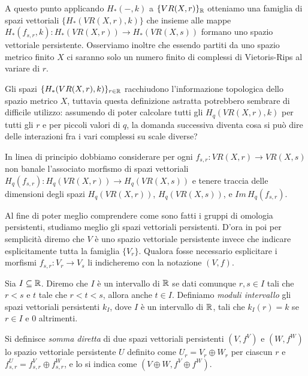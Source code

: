 \begin{sloppypar}
  A questo punto applicando $H_*(-,k)$ a $\{VR(X,r)\}_{\mathbb{R}}$ otteniamo una famiglia di spazi vettoriali $\{H_*(VR(X,r),k)\}$ che insieme alle mappe ${H_*(f_{s,r},k):H_*(VR(X,r))\to H_*(VR(X,s))}$ formano uno spazio vettoriale persistente. Osserviamo inoltre che essendo partiti da uno spazio metrico finito $X$ ci saranno solo un numero finito di complessi di Vietoris-Rips al variare di $r$.
\end{sloppypar}

Gli spazi $\{H_*(VR(X,r),k)\}_{r\in\mathbb{R}}$ racchiudono l'informazione topologica dello spazio metrico $X$, tuttavia questa definizione astratta potrebbero sembrare di difficile utilizzo: assumendo di poter calcolare tutti gli $H_q(VR(X,r),k)$ per tutti gli $r$ e per piccoli valori di $q$, la domanda successiva diventa cosa si può dire delle interazioni fra i vari complessi su scale diverse?

\begin{sloppypar}
  In linea di principio dobbiamo considerare per ogni ${f_{s,r}:VR(X,r)\to VR(X,s)}$ non banale l'associato morfismo di spazi vettoriali ${H_q(f_{s,r}):H_q(VR(X,r))\to H_q(VR(X,s))}$ e tenere traccia delle dimensioni degli spazi $H_q(VR(X,r))$, $H_q(VR(X,s))$, e $Im\,H_q(f_{s,r})$.
\end{sloppypar}

Al fine di poter meglio comprendere come sono fatti i gruppi di omologia persistenti, studiamo meglio gli spazi vettoriali persistenti. D'ora in poi per semplicità diremo che $V$ è uno spazio vettoriale persistente invece che indicare esplicitamente tutta la famiglia $\{V_r\}$. Qualora fosse necessario esplicitare i morfismi $f_{s,r}:V_r\to V_s$ li indicheremo con la notazione $(V,f)$.

\begin{definition}
  Sia $I\subseteq \mathbb{R}$. Diremo che $I$ è un intervallo di $\mathbb{R}$ se dati comunque $r,s\in I$ tali che $r<s$ e $t$ tale che $r<t<s$, allora anche $t\in I$. Definiamo \emph{moduli intervallo} gli spazi vettoriali persistenti $k_I$, dove $I$ è un intervallo di $\mathbb{R}$, tali che $k_I(r) = k$ se $r\in I$ e $0$ altrimenti.
\end{definition}

\begin{definition}
  Si definisce \emph{somma diretta} di due spazi vettoriali persistenti $(V,f^V)$ e $(W,f^W)$ lo spazio vettoriale persistente $U$ definito come $U_r = V_r\oplus W_r$ per ciascun $r$ e $f^U_{s,r} = f^V_{s,r}\oplus f^W_{s,r}$, e lo si indica come $(V\oplus W,f^V\oplus f^W)$.
\end{definition}

